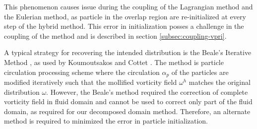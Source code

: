 This phenomenon causes issue during the coupling of the Lagrangian method and the Eulerian method, as particle in the overlap region are re-initialized at every step of the hybrid method. This error in initialization posses a challenge in the coupling of the method and is described in section \ref{subsec:coupling-vpri}.

A typical strategy for recovering the intended distribution is the Beale's Iterative Method \cite{Beale1988}, as used by Koumoutsakos and Cottet \cite{Cottet2000a}. The method is particle circulation processing scheme where the circulation $\alpha_p$ of the particles are modified iteratively such that the mollified vorticity field $\omega^h$ matches the original distribution $\omega$. However, the Beale's method required the correction of complete vorticity field in fluid domain and cannot be used to correct only part of the fluid domain, as required for our decomposed domain method. Therefore, an alternate method is required to minimized the error in particle initialization.

